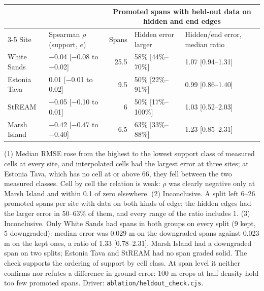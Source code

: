 \documentclass[11pt]{article}
\begin{document}
\begin{center}\scriptsize
\begin{tabular}{@{}llrll@{}}
\toprule
 & & \multicolumn{3}{c}{Promoted spans with held-out data on hidden and end edges} \\
\cmidrule(l){3-5}
Site & Spearman $\rho$ (support, $e$) & Spans & Hidden error larger & Hidden/end error, median ratio \\
\midrule
White Sands & $-$0.04 [$-$0.08 to $-$0.02] & 25.5 & 58\% [44\%--70\%] & 1.07 [0.94--1.31] \\
Estonia Tava & 0.01 [$-$0.01 to 0.02] & 9.5 & 50\% [22\%--91\%] & 0.99 [0.86--1.40] \\
StREAM & $-$0.05 [$-$0.10 to 0.01] & 6 & 50\% [17\%--100\%] & 1.03 [0.52--2.03] \\
Marsh Island & $-$0.42 [$-$0.47 to $-$0.40] & 6.5 & 63\% [33\%--88\%] & 1.23 [0.85--2.31] \\
\bottomrule
\end{tabular}
\end{center}

\noindent (1) Median RMSE rose from the highest to the lowest support class of measured cells at every site, and interpolated cells had the largest error at three sites; at Estonia Tava, which has no cell at or above 66, they fell between the two measured classes. Cell by cell the relation is weak: $\rho$ was clearly negative only at Marsh Island and within 0.1 of zero elsewhere. (2) Inconclusive. A split left 6--26 promoted spans per site with data on both kinds of edge; the hidden edges had the larger error in 50--63\% of them, and every range of the ratio includes 1. (3) Inconclusive. Only White Sands had spans in both groups on every split (9 kept, 5 downgraded): median error was 0.029 m on the downgraded spans against 0.023 m on the kept ones, a ratio of 1.33 [0.78--2.31]. Marsh Island had a downgraded span on two splits; Estonia Tava and StREAM had no span graded solid. The check supports the ordering of support by cell class. At span level it neither confirms nor refutes a difference in ground error: 100 m crops at half density hold too few promoted spans. Driver: \texttt{ablation/heldout\_check.cjs}.
\end{document}
